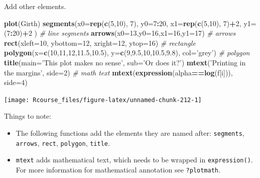 \documentclass[]{book}
\newenvironment{Shaded}{\begin{snugshade}}{\end{snugshade}}
\newcommand{\KeywordTok}[1]{\textcolor[rgb]{0.13,0.29,0.53}{\textbf{#1}}}
\newcommand{\DataTypeTok}[1]{\textcolor[rgb]{0.13,0.29,0.53}{#1}}
\newcommand{\DecValTok}[1]{\textcolor[rgb]{0.00,0.00,0.81}{#1}}
\newcommand{\FloatTok}[1]{\textcolor[rgb]{0.00,0.00,0.81}{#1}}
\newcommand{\StringTok}[1]{\textcolor[rgb]{0.31,0.60,0.02}{#1}}
\newcommand{\CommentTok}[1]{\textcolor[rgb]{0.56,0.35,0.01}{\textit{#1}}}
\newcommand{\OperatorTok}[1]{\textcolor[rgb]{0.81,0.36,0.00}{\textbf{#1}}}
\newcommand{\NormalTok}[1]{#1}
\providecommand{\tightlist}{%
  \setlength{\itemsep}{0pt}\setlength{\parskip}{0pt}}
\theoremstyle{definition}
\theoremstyle{definition}
\theoremstyle{definition}
\theoremstyle{remark}
\begin{document}
Add other elements.

\begin{Shaded}
\begin{Highlighting}[]
\KeywordTok{plot}\NormalTok{(Girth)}
\KeywordTok{segments}\NormalTok{(}\DataTypeTok{x0=}\KeywordTok{rep}\NormalTok{(}\KeywordTok{c}\NormalTok{(}\DecValTok{5}\NormalTok{,}\DecValTok{10}\NormalTok{), }\DecValTok{7}\NormalTok{), }\DataTypeTok{y0=}\DecValTok{7}\OperatorTok{:}\DecValTok{20}\NormalTok{, }\DataTypeTok{x1=}\KeywordTok{rep}\NormalTok{(}\KeywordTok{c}\NormalTok{(}\DecValTok{5}\NormalTok{,}\DecValTok{10}\NormalTok{), }\DecValTok{7}\NormalTok{)}\OperatorTok{+}\DecValTok{2}\NormalTok{, }\DataTypeTok{y1=}\NormalTok{(}\DecValTok{7}\OperatorTok{:}\DecValTok{20}\NormalTok{)}\OperatorTok{+}\DecValTok{2}\NormalTok{ ) }\CommentTok{# line segments}
\KeywordTok{arrows}\NormalTok{(}\DataTypeTok{x0=}\DecValTok{13}\NormalTok{,}\DataTypeTok{y0=}\DecValTok{16}\NormalTok{,}\DataTypeTok{x1=}\DecValTok{16}\NormalTok{,}\DataTypeTok{y1=}\DecValTok{17}\NormalTok{) }\CommentTok{# arrows}
\KeywordTok{rect}\NormalTok{(}\DataTypeTok{xleft=}\DecValTok{10}\NormalTok{, }\DataTypeTok{ybottom=}\DecValTok{12}\NormalTok{,  }\DataTypeTok{xright=}\DecValTok{12}\NormalTok{, }\DataTypeTok{ytop=}\DecValTok{16}\NormalTok{) }\CommentTok{# rectangle}
\KeywordTok{polygon}\NormalTok{(}\DataTypeTok{x=}\KeywordTok{c}\NormalTok{(}\DecValTok{10}\NormalTok{,}\DecValTok{11}\NormalTok{,}\DecValTok{12}\NormalTok{,}\FloatTok{11.5}\NormalTok{,}\FloatTok{10.5}\NormalTok{), }\DataTypeTok{y=}\KeywordTok{c}\NormalTok{(}\DecValTok{9}\NormalTok{,}\FloatTok{9.5}\NormalTok{,}\DecValTok{10}\NormalTok{,}\FloatTok{10.5}\NormalTok{,}\FloatTok{9.8}\NormalTok{), }\DataTypeTok{col=}\StringTok{'grey'}\NormalTok{) }\CommentTok{# polygon}
\KeywordTok{title}\NormalTok{(}\DataTypeTok{main=}\StringTok{'This plot makes no sense'}\NormalTok{, }\DataTypeTok{sub=}\StringTok{'Or does it?'}\NormalTok{) }
\KeywordTok{mtext}\NormalTok{(}\StringTok{'Printing in the margins'}\NormalTok{, }\DataTypeTok{side=}\DecValTok{2}\NormalTok{) }\CommentTok{# math text}
\KeywordTok{mtext}\NormalTok{(}\KeywordTok{expression}\NormalTok{(alpha}\OperatorTok{==}\KeywordTok{log}\NormalTok{(f[i])), }\DataTypeTok{side=}\DecValTok{4}\NormalTok{)}
\end{Highlighting}
\end{Shaded}

\texttt{[image: Rcourse\_files/figure-latex/unnamed-chunk-212-1]}

Things to note:

\begin{itemize}
\tightlist
\item
  The following functions add the elements they are named after:
  \texttt{segments}, \texttt{arrows}, \texttt{rect}, \texttt{polygon},
  \texttt{title}.
\item
  \texttt{mtext} adds mathematical text, which needs to be wrapped in
  \texttt{expression()}. For more information for mathematical
  annotation see \texttt{?plotmath}.
\end{itemize}
\end{document}
